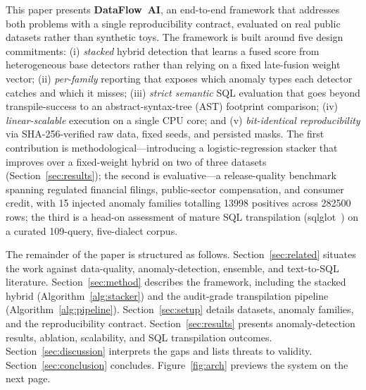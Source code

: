 \documentclass{ieeeaccess}
\begin{document}
This paper presents \textbf{DataFlow~AI}, an end-to-end framework that addresses both problems with a single
reproducibility contract, evaluated on real public datasets rather than synthetic toys. The framework is built
around five design commitments:
(i) \emph{stacked} hybrid detection that learns a fused score from heterogeneous base detectors rather than
relying on a fixed late-fusion weight vector;
(ii) \emph{per-family} reporting that exposes which anomaly types each detector catches and which it misses;
(iii) \emph{strict semantic} SQL evaluation that goes beyond transpile-success to an abstract-syntax-tree (AST)
footprint comparison;
(iv) \emph{linear-scalable} execution on a single CPU core; and
(v) \emph{bit-identical reproducibility} via SHA-256-verified raw data, fixed seeds, and persisted masks. The first
contribution is methodological---introducing a logistic-regression stacker that improves over a fixed-weight hybrid
on two of three datasets (Section~\ref{sec:results}); the second is evaluative---a release-quality benchmark
spanning regulated financial filings, public-sector compensation, and consumer credit, with 15 injected anomaly
families totalling \num{13998} positives across \num{282500} rows; the third is a head-on assessment of mature
SQL transpilation (sqlglot~\cite{sqlglot2024}) on a curated 109-query, five-dialect corpus.

The remainder of the paper is structured as follows. Section~\ref{sec:related} situates the work against
data-quality, anomaly-detection, ensemble, and text-to-SQL literature. Section~\ref{sec:method} describes the
framework, including the stacked hybrid (Algorithm~\ref{alg:stacker}) and the audit-grade transpilation pipeline
(Algorithm~\ref{alg:pipeline}). Section~\ref{sec:setup} details datasets, anomaly families, and the
reproducibility contract. Section~\ref{sec:results} presents anomaly-detection results, ablation, scalability,
and SQL transpilation outcomes. Section~\ref{sec:discussion} interprets the gaps and lists threats to validity.
Section~\ref{sec:conclusion} concludes. Figure~\ref{fig:arch} previews the system on the next page.
\end{document}
